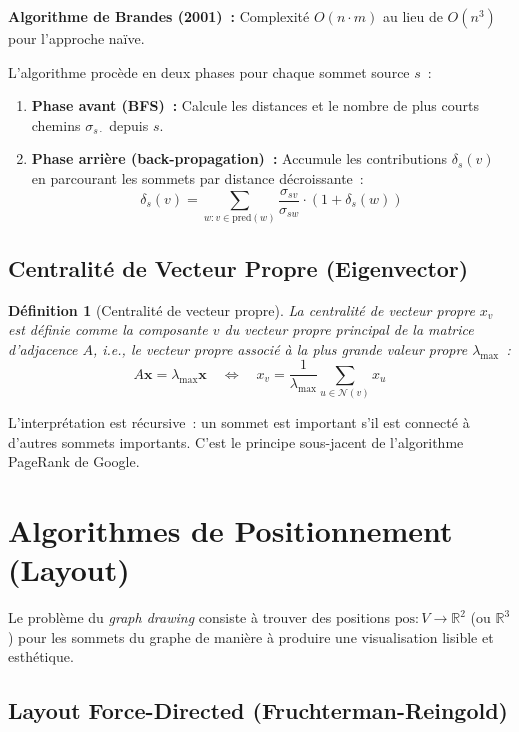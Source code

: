 \documentclass[12pt,a4paper]{article}
\newtheorem{definition}{Définition}[section]
\begin{document}
\textbf{Algorithme de Brandes (2001)~:} Complexité $O(n \cdot m)$ au lieu de $O(n^3)$ pour l'approche naïve.

L'algorithme procède en deux phases pour chaque sommet source $s$~:
\begin{enumerate}
    \item \textbf{Phase avant (BFS)~:} Calcule les distances et le nombre de plus courts chemins $\sigma_{s \cdot}$ depuis $s$.
    \item \textbf{Phase arrière (back-propagation)~:} Accumule les contributions $\delta_s(v)$ en parcourant les sommets par distance décroissante~:
    \[
        \delta_s(v) = \sum_{w : v \in \text{pred}(w)} \frac{\sigma_{sv}}{\sigma_{sw}} \cdot (1 + \delta_s(w))
    \]
\end{enumerate}

\subsection{Centralité de Vecteur Propre (Eigenvector)}

\begin{definition}[Centralité de vecteur propre]
La \emph{centralité de vecteur propre} $x_v$ est définie comme la composante $v$ du vecteur propre principal de la matrice d'adjacence $A$, i.e., le vecteur propre associé à la plus grande valeur propre $\lambda_{\max}$~:
\[
    A \mathbf{x} = \lambda_{\max} \mathbf{x} \quad \Leftrightarrow \quad x_v = \frac{1}{\lambda_{\max}} \sum_{u \in \mathcal{N}(v)} x_u
\]
\end{definition}

L'interprétation est récursive~: un sommet est important s'il est connecté à d'autres sommets importants. C'est le principe sous-jacent de l'algorithme PageRank de Google.

\section{Algorithmes de Positionnement (Layout)}
\label{sec:layouts}

Le problème du \emph{graph drawing} consiste à trouver des positions $\text{pos} : V \to \mathbb{R}^2$ (ou $\mathbb{R}^3$) pour les sommets du graphe de manière à produire une visualisation lisible et esthétique.

\subsection{Layout Force-Directed (Fruchterman-Reingold)}
\end{document}
